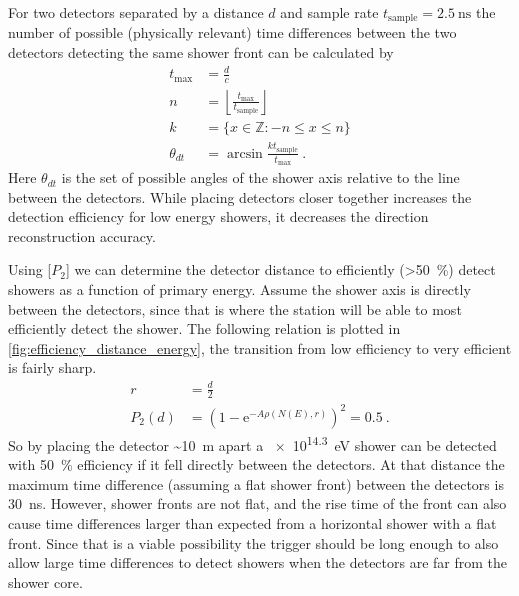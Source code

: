 For two detectors separated by a distance $d$ and sample rate $t_{\mathrm{sample}} = \SI{2.5}{\ns}$ the number of possible (physically relevant) time differences between the two detectors detecting the same shower front can be calculated by
%
\begin{equation}
    \begin{split}
        t_{\mathrm{max}} &= \frac{d}{c} \\
        n &= \left\lfloor \frac{t_{\mathrm{max}}}{t_{\mathrm{sample}}} \right\rfloor \\
        k &= \{x \in \mathbb{Z} : -n \leq x \leq n \} \\
        \theta_{dt} &= \arcsin \frac{k t_{\mathrm{sample}}}{t_{\mathrm{max}}} \ .
    \end{split}
\end{equation}
%
Here $\theta_{dt}$ is the set of possible angles of the shower axis relative to the line between the detectors. While placing detectors closer together increases the detection efficiency for low energy showers, it decreases the direction reconstruction accuracy.

Using [$P_2$] we can determine the detector distance to efficiently (\SI{>50}{\percent}) detect showers as a function of primary energy. Assume the shower axis is directly between the detectors, since that is where the station will be able to most efficiently detect the shower. The following relation is plotted in \cref{fig:efficiency_distance_energy}, the transition from low efficiency to very efficient is fairly sharp.
%
\begin{equation}
\begin{split}
    r &= \frac{d}{2} \\
    P_2(d) &= \left(1 - \mathrm{e}^{-A \rho(N(E), r)} \right)^2 = 0.5 \ .
\end{split}
\end{equation}
%
So by placing the detector \SI{~10}{\meter} apart a \SI{e14.3}{\eV} shower can be detected with \SI{50}{\percent} efficiency if it fell directly between the detectors. At that distance the maximum time difference (assuming a flat shower front) between the detectors is \SI{30}{\ns}. However, shower fronts are not flat, and the rise time of the front can also cause time differences larger than expected from a horizontal shower with a flat front. Since that is a viable possibility the trigger should be long enough to also allow large time differences to detect showers when the detectors are far from the shower core.

